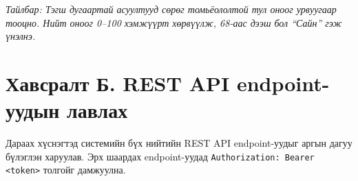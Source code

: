 \vspace{8pt}
\noindent\textit{Тайлбар: Тэгш дугаартай асуултууд сөрөг томьёололтой тул оноог урвуугаар тооцно.
Нийт оноог 0--100 хэмжүүрт хөрвүүлж, 68-аас дээш бол ``Сайн'' гэж үнэлнэ.}

\newpage
\section*{Хавсралт Б. REST API endpoint-уудын лавлах}

Дараах хүснэгтэд системийн бүх нийтийн REST API endpoint-уудыг аргын дагуу бүлэглэн харуулав.
Эрх шаардах endpoint-уудад \texttt{Authorization: Bearer <token>} толгойг дамжуулна.

